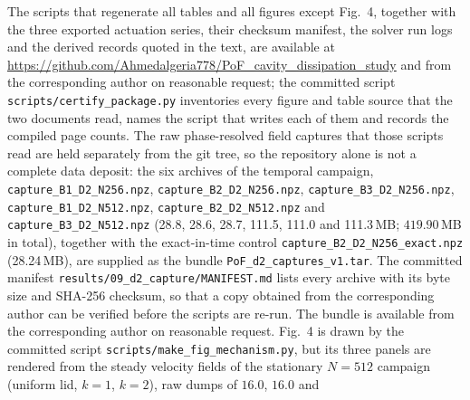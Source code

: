 \documentclass[11pt,a4paper]{article}
\newenvironment{chgadd}{\par\color{blue}}{\par\color{black}}
\begin{document}
\begin{chgadd}
The scripts that regenerate all tables and all figures except Fig.~4, together
with the three exported actuation series, their checksum manifest, the solver run
logs and the derived records quoted in the text, are available at
\url{https://github.com/Ahmedalgeria778/PoF_cavity_dissipation_study} and from the
corresponding author on reasonable request; the committed script
\texttt{scripts/}\hspace{0pt}\texttt{certify\_package.py} inventories every figure and
table source that the two documents read, names the script that writes each of them
and records the compiled page counts. The raw phase-resolved field captures
that those scripts read are held separately from the git tree, so the
repository alone is not a complete data deposit: the six archives of the temporal
campaign, \texttt{capture\_B1}\hspace{0pt}\texttt{\_D2\_N256.npz},
\texttt{capture\_B2}\hspace{0pt}\texttt{\_D2\_N256.npz},
\texttt{capture\_B3}\hspace{0pt}\texttt{\_D2\_N256.npz},
\texttt{capture\_B1}\hspace{0pt}\texttt{\_D2\_N512.npz},
\texttt{capture\_B2}\hspace{0pt}\texttt{\_D2\_N512.npz} and
\texttt{capture\_B3}\hspace{0pt}\texttt{\_D2\_N512.npz}
(28.8, 28.6, 28.7, 111.5, 111.0 and 111.3\,MB; $419.90$\,MB in total), together with
the exact-in-time control
\texttt{capture\_B2}\hspace{0pt}\texttt{\_D2\_N256}\hspace{0pt}\texttt{\_exact.npz}
(28.24\,MB), are supplied as the bundle
\texttt{PoF\_d2}\hspace{0pt}\texttt{\_captures}\hspace{0pt}\texttt{\_v1.tar}. The
committed manifest
\texttt{results/09\_d2}\hspace{0pt}\texttt{\_capture/MANIFEST.md} lists every
archive with its byte size and SHA-256 checksum, so that a copy obtained from the
corresponding author can be verified before the scripts are re-run. The bundle is
available from the corresponding author on reasonable request. Fig.~4 is drawn by
the committed script \texttt{scripts/}\hspace{0pt}\texttt{make\_fig\_mechanism.py},
but its three panels are rendered from the steady velocity fields of the stationary
$N=512$ campaign (uniform lid, \(k=1\), \(k=2\)), raw dumps of $16.0$, $16.0$ and

\end{chgadd}
\end{document}
